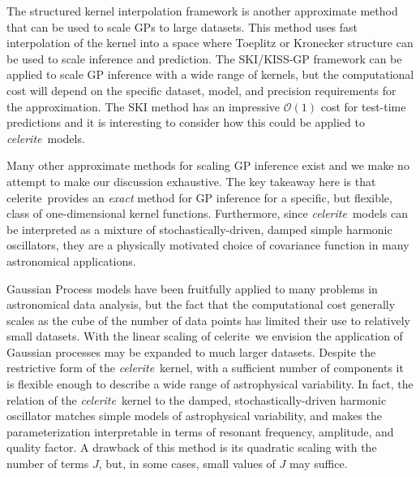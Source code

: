 \documentclass[manuscript, letterpaper]{aastex6}
\makeatletter
\let\origsection\section
\renewcommand\section{\@ifstar{\starsection}{\nostarsection}}
\newcommand\nostarsection[1]{\sectionprelude\origsection{#1}}
\newcommand\starsection[1]{\sectionprelude\origsection*{#1}}
\newcommand\sectionprelude{\vspace{1em}}
\newcommand{\project}[1]{\textsf{#1}}
\newcommand{\celerite}{\project{celerite}}
\newcommand{\celeriteterm}{\emph{celerite}}
\makeatother
\begin{document}
The structured kernel interpolation \citep[SKI/KISS-GP][]{Wilson:2015}
framework is another approximate method that can be used to scale GPs to large
datasets.
This method uses fast interpolation of the kernel into a space where Toeplitz
or Kronecker structure can be used to scale inference and prediction.
The SKI/KISS-GP framework can be applied to scale GP inference with a wide
range of kernels, but the computational cost will depend on the specific
dataset, model, and precision requirements for the approximation.
The SKI method has an impressive $\mathcal{O}(1)$ cost for test-time
predictions and it is interesting to consider how this could be applied to
\celeriteterm\ models.

Many other approximate methods for scaling GP inference exist \citep[see, for
example,][and references therein]{Wilson:2015a} and we make no attempt to make
our discussion exhaustive.
The key takeaway here is that \celerite\ provides an \emph{exact} method for
GP inference for a specific, but flexible, class of one-dimensional kernel
functions.
Furthermore, since \celeriteterm\ models can be interpreted as a mixture of
stochastically-driven, damped simple harmonic oscillators, they are a
physically motivated choice of covariance function in many astronomical applications.

\section{Discussion}

Gaussian Process models have been fruitfully applied to many problems in
astronomical data analysis, but the fact that the computational cost generally
scales as the cube of the number of data points has limited their use to relatively
small datasets.
With the linear scaling of \celerite\, we envision the application of Gaussian
processes may be expanded to much larger datasets.
Despite the restrictive form of the \celeriteterm\ kernel, with a sufficient
number of components it is flexible enough to describe a wide range of
astrophysical variability.
In fact, the relation of the \celeriteterm\ kernel to the damped,
stochastically-driven harmonic oscillator matches simple models of
astrophysical variability, and makes the parameterization interpretable in
terms of resonant frequency, amplitude, and quality factor.
A drawback of this method is its quadratic scaling with the number of
terms $J$, but, in some cases, small values of $J$ may suffice.
\end{document}
